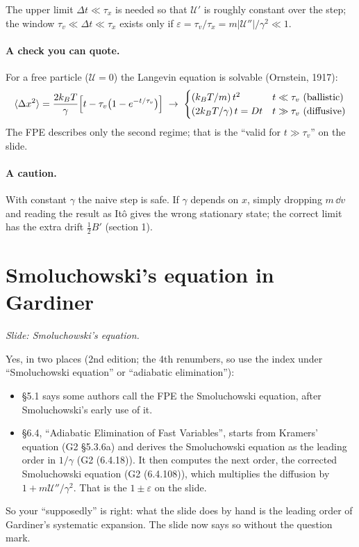 \documentclass[11pt]{article}
\newcommand{\cU}{\mathcal{U}}
\begin{document}
The upper limit $\Delta t\ll\tau_x$ is needed so that $\cU'$ is roughly constant over the step; the window
$\tau_v\ll\Delta t\ll\tau_x$ exists only if $\varepsilon=\tau_v/\tau_x=m|\cU''|/\gamma^2\ll1$.

\paragraph{A check you can quote.} For a free particle ($\cU=0$) the Langevin equation is solvable (Ornstein, 1917):
\[
  \langle\Delta x^2\rangle = \frac{2k_BT}{\gamma}\Bigl[t-\tau_v\bigl(1-e^{-t/\tau_v}\bigr)\Bigr]
  \;\to\;
  \begin{cases} (k_BT/m)\,t^2 & t\ll\tau_v \ \text{(ballistic)}\\ (2k_BT/\gamma)\,t=Dt & t\gg\tau_v\ \text{(diffusive)} \end{cases}
\]
The FPE describes only the second regime; that is the ``valid for $t\gg\tau_v$'' on the slide.

\paragraph{A caution.} With constant $\gamma$ the naive step is safe. If $\gamma$ depends on $x$, simply dropping $m\,\dd v$ and
reading the result as It\^o gives the wrong stationary state; the correct limit has the extra drift $\frac12B'$
(section 1).

\section{Smoluchowski's equation in Gardiner}
\emph{Slide: Smoluchowski's equation.}

Yes, in two places (2nd edition; the 4th renumbers, so use the index under ``Smoluchowski equation'' or
``adiabatic elimination''):
\begin{itemize}
  \item \S5.1 says some authors call the FPE the Smoluchowski equation, after Smoluchowski's early use of it.
  \item \S6.4, ``Adiabatic Elimination of Fast Variables'', starts from Kramers' equation (G2 \S5.3.6a) and derives the
        Smoluchowski equation as the leading order in $1/\gamma$ (G2 (6.4.18)). It then computes the next order, the
        corrected Smoluchowski equation (G2 (6.4.108)), which multiplies the diffusion by $1+m\cU''/\gamma^2$. That is
        the $1\pm\varepsilon$ on the slide.
\end{itemize}
So your ``supposedly'' is right: what the slide does by hand is the leading order of Gardiner's systematic
expansion. The slide now says so without the question mark.
\end{document}

